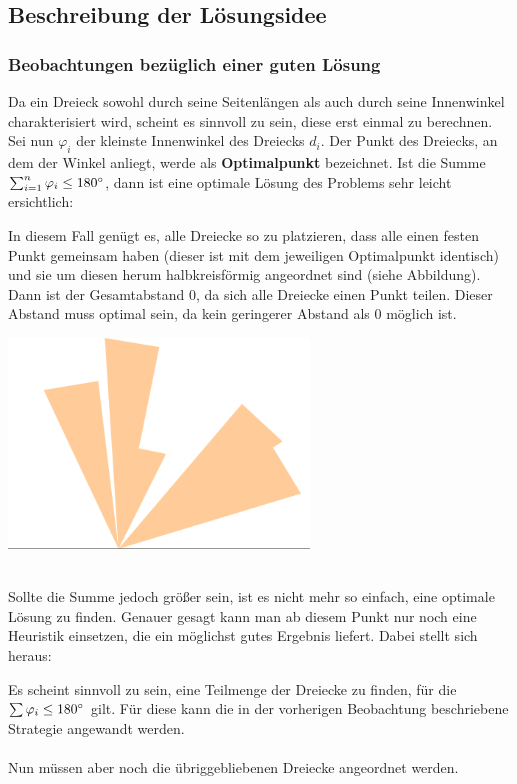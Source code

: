 \documentclass[a4paper, notitlepage, 12pt]{scrartcl}
\begin{document}
  \subsection{Beschreibung der Lösungsidee}
  \subsubsection{Beobachtungen bezüglich einer guten Lösung}  
  Da ein Dreieck sowohl durch seine Seitenlängen als auch durch seine Innenwinkel charakterisiert wird, scheint es sinnvoll zu sein, diese erst einmal zu berechnen. Sei nun $\varphi_i$ der kleinste Innenwinkel des Dreiecks $d_i$. Der Punkt des Dreiecks, an dem der Winkel anliegt, werde als \textbf{Optimalpunkt} bezeichnet. Ist die Summe $\sum_{i=1}^{n} \varphi_i \leq 180\degree$, dann ist eine optimale Lösung des Problems sehr leicht ersichtlich:
  \begin{kasten}
  	In diesem Fall genügt es, alle Dreiecke so zu platzieren, dass alle einen festen Punkt gemeinsam haben (dieser ist mit dem jeweiligen Optimalpunkt identisch) und sie um diesen herum halbkreisförmig angeordnet sind (siehe Abbildung). Dann ist der Gesamtabstand $0$, da sich alle Dreiecke einen Punkt teilen. Dieser Abstand muss optimal sein, da kein geringerer Abstand als $0$ möglich ist. \\
  	{\centering
  		\includegraphics[width=0.6\textwidth]{pics/optimal-tri.png}
  	\par}
  \end{kasten} ~\\
 Sollte die Summe jedoch größer sein, ist es nicht mehr so einfach, eine optimale Lösung zu finden. Genauer gesagt kann man ab diesem Punkt nur noch eine Heuristik einsetzen, die ein möglichst gutes Ergebnis liefert. Dabei stellt sich heraus:
 \begin{kasten}
 	Es scheint sinnvoll zu sein, eine Teilmenge der Dreiecke zu finden, für die $\sum \varphi_i \leq 180\degree$ gilt. Für diese kann die in der vorherigen Beobachtung beschriebene Strategie angewandt werden. \\ \\
 	Nun müssen aber noch die übriggebliebenen Dreiecke angeordnet werden. %
 \end{kasten}
\end{document}
